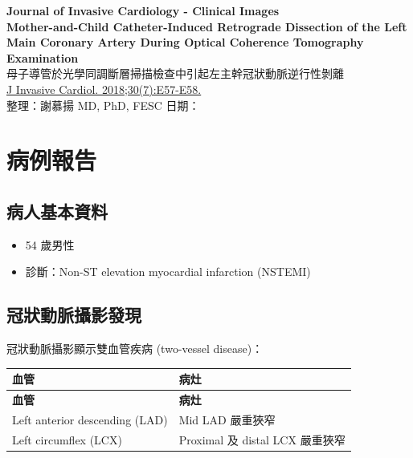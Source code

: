 \documentclass[12pt,a4paper]{article}
\begin{document}
\begin{center}
{\LARGE\bfseries\textcolor{emergency_red}{Journal of Invasive Cardiology - Clinical Images}}\\[0.5cm]
{\Large\textbf{Mother-and-Child Catheter-Induced Retrograde Dissection of the Left Main Coronary Artery During Optical Coherence Tomography Examination}}\\[0.3cm]
{\large 母子導管於光學同調斷層掃描檢查中引起左主幹冠狀動脈逆行性剝離}\\[0.5cm]
{\normalsize \href{https://pubmed.ncbi.nlm.nih.gov/29958179/}{J Invasive Cardiol. 2018;30(7):E57-E58.}}\\[0.3cm]
{\normalsize 整理：謝慕揚 MD, PhD, FESC \quad 日期：\mydate}
\end{center}

\vspace{0.5cm}

\section{病例報告}

\subsection{病人基本資料}

\begin{itemize}
    \item 54 歲男性
    \item 診斷：Non-ST elevation myocardial infarction (NSTEMI)
\end{itemize}

\subsection{冠狀動脈攝影發現}

冠狀動脈攝影顯示雙血管疾病 (two-vessel disease)：

\begin{longtable}{p{5cm}p{9cm}}
\toprule
\textbf{血管} & \textbf{病灶} \\
\midrule
\endfirsthead
\toprule
\textbf{血管} & \textbf{病灶} \\
\midrule
\endhead
Left anterior descending (LAD) & Mid LAD 嚴重狹窄 \\
\midrule
Left circumflex (LCX) & Proximal 及 distal LCX 嚴重狹窄 \\
\bottomrule
\end{longtable}
\end{document}
